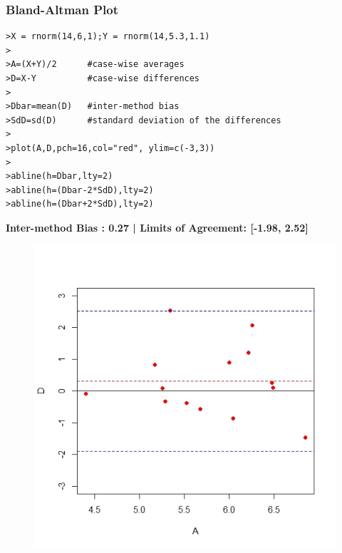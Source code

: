 \documentclass[compress]{beamer}        %
\begin{document}
\begin{frame}[fragile]
\frametitle{Bland-Altman Plot}
\begin{verbatim}
>X = rnorm(14,6,1);Y = rnorm(14,5.3,1.1)
>
>A=(X+Y)/2		#case-wise averages
>D=X-Y			#case-wise differences
>		
>Dbar=mean(D)	#inter-method bias
>SdD=sd(D)		#standard deviation of the differences
>
>plot(A,D,pch=16,col="red", ylim=c(-3,3))
>
>abline(h=Dbar,lty=2)
>abline(h=(Dbar-2*SdD),lty=2)
>abline(h=(Dbar+2*SdD),lty=2)
\end{verbatim}
\end{frame}


\begin{frame}
	\vspace{-0.1cm}
\textbf{Inter-method Bias : 0.27 | Limits of Agreement: [-1.98, 2.52]}
\vspace{-0.2cm}
\begin{figure}
\centering
\includegraphics[width=0.6\linewidth]{NewBAplot2}
\label{fig:SimpleBAplot2}
\end{figure}


\end{frame}
\end{document}
